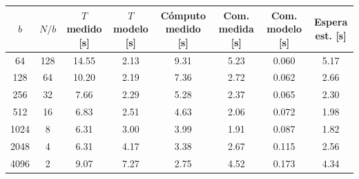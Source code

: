 \begin{tabular}{cccccccc}
\toprule
$b$ & $N/b$ & $T$ medido [s] & $T$ modelo [s] & Cómputo medido [s] & Com. medida [s] & Com. modelo [s] & Espera est. [s] \\
\midrule
64 & 128 & 14.55 & 2.13 & 9.31 & 5.23 & 0.060 & 5.17 \\
128 & 64 & 10.20 & 2.19 & 7.36 & 2.72 & 0.062 & 2.66 \\
256 & 32 & 7.66 & 2.29 & 5.28 & 2.37 & 0.065 & 2.30 \\
512 & 16 & 6.83 & 2.51 & 4.63 & 2.06 & 0.072 & 1.98 \\
1024 & 8 & 6.31 & 3.00 & 3.99 & 1.91 & 0.087 & 1.82 \\
2048 & 4 & 6.31 & 4.17 & 3.38 & 2.67 & 0.115 & 2.56 \\
4096 & 2 & 9.07 & 7.27 & 2.75 & 4.52 & 0.173 & 4.34 \\
\bottomrule
\end{tabular}

